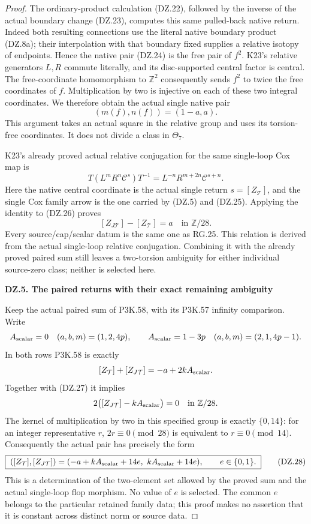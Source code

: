 \begin{proof}
The ordinary-product calculation (DZ.22), followed by the inverse
of the actual boundary change (DZ.23), computes this same
pulled-back native return. Indeed both resulting connections use
the literal native boundary product (DZ.8a); their interpolation
with that boundary fixed supplies a relative isotopy of endpoints.
Hence the native pair (DZ.24) is the free pair of \(f^2\).
K23's relative generators \(L,R\) commute literally, and its
disc-supported central factor is central. The free-coordinate
homomorphism to \(\mathbb Z^2\) consequently sends
\(f^2\) to twice the free coordinates of \(f\).
Multiplication by two is injective on each of these two integral
coordinates. We therefore obtain the actual single native pair
\[
                         (m(f),n(f))=(1-a,a).       \tag{DZ.26}
\]
This argument takes an actual square in the relative group and
uses its torsion-free coordinates. It does not divide a class in
\(\Theta_7\).

K23's already proved actual relative conjugation for the same
single-loop Cox map is
\[
 T(L^mR^n\mathcal C^s)T^{-1}
          =L^{-n}R^{m+2n}\mathcal C^{s+n}.
\]
Here the native central coordinate is the actual single return
\(s=[Z_{\mathcal T}]\), and the single Cox family arrow is the
one carried by (DZ.5) and (DZ.25). Applying the identity to
(DZ.26) proves
\[
                 [Z_{J\mathcal T}]-[Z_{\mathcal T}]
                         =a\quad\text{in }\mathbb Z/28. \tag{DZ.27}
\]
Every source/cap/scalar datum is the same one as RG.25. This
relation is derived from the actual single-loop relative
conjugation. Combining it with the already proved paired sum
still leaves a two-torsion ambiguity for either individual
source-zero class; neither is selected here.

\par

\medskip\noindent\textbf{DZ.5. The paired returns with their exact remaining ambiguity}

\par\nobreak

Keep the actual paired sum of P3K.58, with its P3K.57 infinity
comparison. Write
\[
 A_{\rm scalar}=0\quad(a,b,m)=(1,2,4p),\qquad
 A_{\rm scalar}=1-3p\quad(a,b,m)=(2,1,4p-1).
\]
In both rows P3K.58 is exactly
\[
       [Z_{\mathcal T}]+[Z_{J\mathcal T}]
                          =-a+2kA_{\rm scalar}.
\]
Together with (DZ.27) it implies
\[
             2\bigl([Z_{J\mathcal T}]-kA_{\rm scalar}\bigr)=0
                              \quad\text{in }\mathbb Z/28.
\]
The kernel of multiplication by two in this specified group is
exactly \(\{0,14\}\): for an integer representative \(r\),
\(2r\equiv0\pmod{28}\) is equivalent to \(r\equiv0\pmod{14}\).
Consequently the actual pair has precisely the form
\[
 \boxed{\;
 ([Z_{\mathcal T}],[Z_{J\mathcal T}])
   =(-a+kA_{\rm scalar}+14e,\ kA_{\rm scalar}+14e),
       \qquad e\in\{0,1\}.\;}                       \tag{DZ.28}
\]
This is a determination of the two-element set allowed by the
proved sum and the actual single-loop flop morphism. No value of
\(e\) is selected. The common \(e\) belongs to the particular
retained family data; this proof makes no assertion that it is
constant across distinct norm or source data.


\end{proof}
